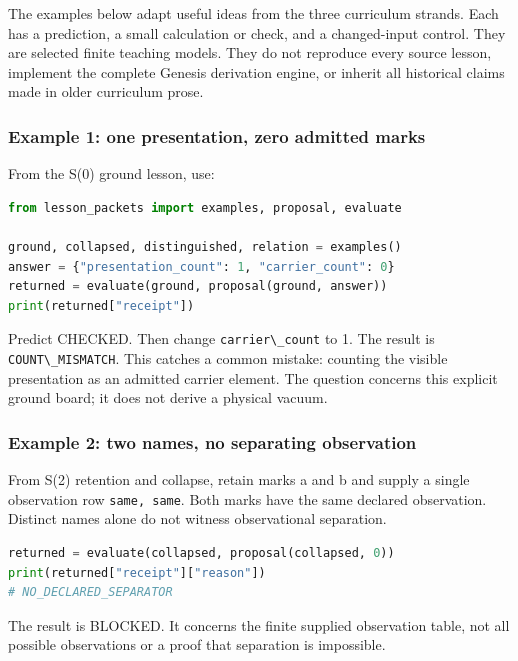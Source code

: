 \documentclass[
  11pt,
]{article}
\newcommand{\passthrough}[1]{#1}
\begin{document}
The examples below adapt useful ideas from the three curriculum strands.
Each has a prediction, a small calculation or check, and a changed-input
control. They are selected finite teaching models. They do not reproduce
every source lesson, implement the complete Genesis derivation engine,
or inherit all historical claims made in older curriculum prose.

\subsubsection{Example 1: one presentation, zero admitted
marks}\label{example-1-one-presentation-zero-admitted-marks}

From the S(0) ground lesson, use:

\begin{lstlisting}[language=Python]
from lesson_packets import examples, proposal, evaluate

ground, collapsed, distinguished, relation = examples()
answer = {"presentation_count": 1, "carrier_count": 0}
returned = evaluate(ground, proposal(ground, answer))
print(returned["receipt"])
\end{lstlisting}

Predict CHECKED. Then change \passthrough{\lstinline!carrier\_count!} to
1. The result is \passthrough{\lstinline!COUNT\_MISMATCH!}. This catches
a common mistake: counting the visible presentation as an admitted
carrier element. The question concerns this explicit ground board; it
does not derive a physical vacuum.

\subsubsection{Example 2: two names, no separating
observation}\label{example-2-two-names-no-separating-observation}

From S(2) retention and collapse, retain marks a and b and supply a
single observation row \passthrough{\lstinline!same, same!}. Both marks
have the same declared observation. Distinct names alone do not witness
observational separation.

\begin{lstlisting}[language=Python]
returned = evaluate(collapsed, proposal(collapsed, 0))
print(returned["receipt"]["reason"])
# NO_DECLARED_SEPARATOR
\end{lstlisting}

The result is BLOCKED. It concerns the finite supplied observation
table, not all possible observations or a proof that separation is
impossible.
\end{document}
